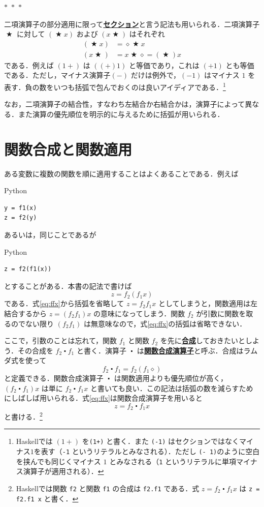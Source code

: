 \documentclass[a5paper,twoside,fleqn,draft]{jsbook}
\newcommand{\separator}{\begin{center}$*$~$*$~$*$\end{center}}
\newcommand{\programminglanguage}[1]{\textsf{#1}}
\newcommand{\haskell}{\programminglanguage{Haskell}}
\newcommand{\python}{\programminglanguage{Python}}
\newcommand{\keyword}[1]{{\underline{\textbf{#1}}}}
\newcommand{\code}[1]{\texttt{#1}}
\newenvironment{pythoncode}{\begin{itembox}[r]{\python}}{\end{itembox}}
\newcommand{\mAnonParam}{\diamond}
\DeclareMathOperator{\mBinOp}{\bigstar}
\DeclareMathOperator{\mCompFunc}{\centerdot}
\begin{document}
\separator

二項演算子の部分適用に限って\keyword{セクション}と言う記法も用いられる．二項演算子 $\mBinOp$ に対して $(\mBinOp x)$ および $(x\mBinOp)$ はそれぞれ
\begin{align}
  (\mBinOp x)
  &=\mAnonParam\mBinOp x\\
  (x\mBinOp)
  &=x\mBinOp\mAnonParam=(\mBinOp)x
\end{align}
である．例えば $(1+)$ は $((+)1)$ と等価であり，これは $(+1)$ とも等価である．ただし，マイナス演算子$(-)$ だけは例外で，$(-1)$ はマイナス $1$ を表す．負の数をいつも括弧で包んでおくのは良いアイディアである．\footnote{\haskell では $(1+)$ を\code{(1+)} と書く．また \code{(-1)} はセクションではなくマイナス$1$を表す（\code{-1} というリテラルとみなされる）．ただし \code{(- 1)}のように空白を挟んでも同じくマイナス $1$ とみなされる（\code{1} というリテラルに単項マイナス演算子が適用される）．}

なお，二項演算子の結合性，すなわち左結合か右結合かは，演算子によって異なる．また演算の優先順位を明示的に与えるために括弧が用いられる．

\section{関数合成と関数適用}

ある変数に複数の関数を順に適用することはよくあることである．例えば
\begin{pythoncode}
\begin{verbatim}
y = f1(x)
z = f2(y)
\end{verbatim}
\end{pythoncode}
あるいは，同じことであるが
\begin{pythoncode}
\begin{verbatim}
z = f2(f1(x))
\end{verbatim}
\end{pythoncode}
とすることがある．本書の記法で書けば
\begin{equation}
  \label{eq:ffx}
  z=
  f_2(f_1x)
\end{equation}
である．式\eqref{eq:ffx}から括弧を省略して $z=f_2f_1x$ としてしまうと，関数適用は左結合するから $z=(f_2f_1)x$ の意味になってしまう．関数 $f_2$ が引数に関数を取るのでない限り $(f_2f_1)$ は無意味なので，式\eqref{eq:ffx}の括弧は省略できない．

ここで，引数のことは忘れて，関数 $f_1$ と関数 $f_2$ を先に\keyword{合成}しておきたいとしよう．その合成を $f_2\mCompFunc f_1$ と書く．演算子 $\mCompFunc$ は\keyword{関数合成演算子}と呼ぶ．合成はラムダ式を使って
\begin{equation}
  f_2\mCompFunc f_1
  =f_2(f_1\mAnonParam)
\end{equation}
と定義できる．関数合成演算子 $\mCompFunc$ は関数適用よりも優先順位が高く， $\left(f_2\mCompFunc f_1\right)x$ は単に $f_2\mCompFunc f_1x$ と書いても良い．この記法は括弧の数を減らすためにしばしば用いられる．式\eqref{eq:ffx}は関数合成演算子を用いると
\begin{equation}
  z
  =f_2\mCompFunc f_1x
\end{equation}
と書ける．\footnote{\haskell では関数 \code{f2} と関数 \code{f1} の合成は \code{f2.f1} である．式 $z=f_2\mCompFunc f_1x$ は \code{z = f2.f1 x} と書く．}
\end{document}
